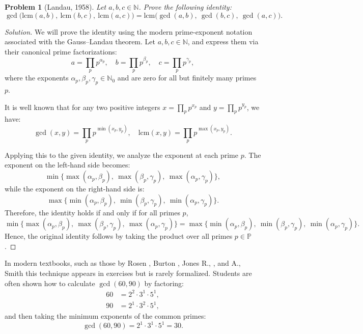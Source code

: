 \documentclass[11pt]{article}
\theoremstyle{plain}
\newtheorem*{problem}{Problem}
\begin{document}
\begin{problem}[Landau, 1958]
Let \( a, b, c \in \mathbb{N} \). Prove the following identity:
\[
\gcd\big(\mathrm{lcm}(a,b),\ \mathrm{lcm}(b,c),\ \mathrm{lcm}(a,c)\big) = 
\mathrm{lcm}\big(\gcd(a,b),\ \gcd(b,c),\ \gcd(a,c)\big).
\]
\end{problem}
\begin{proof}[Solution]
We will prove the identity using the modern prime-exponent notation associated with the Gauss–Landau theorem. Let \( a, b, c \in \mathbb{N} \), and express them via their canonical prime factorizations:
\[
a = \prod_p p^{\alpha_p}, \quad b = \prod_p p^{\beta_p}, \quad c = \prod_p p^{\gamma_p},
\]
where the exponents \( \alpha_p, \beta_p, \gamma_p \in \mathbb{N}_0 \) and are zero for all but finitely many primes \( p \).
\medskip

\noindent
It is well known that for any two positive integers \( x = \prod_p p^{x_p} \) and \( y = \prod_p p^{y_p} \), we have:
\[
\gcd(x, y) = \prod_p p^{\min(x_p, y_p)}, \quad 
\mathrm{lcm}(x, y) = \prod_p p^{\max(x_p, y_p)}.
\]

\noindent
Applying this to the given identity, we analyze the exponent at each prime \( p \). The exponent on the left-hand side becomes:
\[
\min\Big\{ \max(\alpha_p, \beta_p),\ \max(\beta_p, \gamma_p),\ \max(\alpha_p, \gamma_p) \Big\},
\]
while the exponent on the right-hand side is:
\[
\max\Big\{ \min(\alpha_p, \beta_p),\ \min(\beta_p, \gamma_p),\ \min(\alpha_p, \gamma_p) \Big\}.
\]
\noindent
Therefore, the identity holds if and only if for all primes \( p \),
\[
\min\big\{ \max(\alpha_p, \beta_p),\ \max(\beta_p, \gamma_p),\ \max(\alpha_p, \gamma_p) \big\}
=
\max\big\{ \min(\alpha_p, \beta_p),\ \min(\beta_p, \gamma_p),\ \min(\alpha_p, \gamma_p) \big\}.
\]
Hence, the original identity follows by taking the product over all primes \( p \in \mathbb{P} \).
\end{proof}


In modern textbooks, such as those by Rosen \cite{Rosen}, Burton \cite{Burton}, Jones R., \cite{Jones2010}, and A., Smith \cite{Smith2015}
this technique appears in exercises but is rarely formalized. Students are often shown how to calculate $\gcd(60, 90)$ by factoring:
\begin{align*}
60 &= 2^2 \cdot 3^1 \cdot 5^1, \\
90 &= 2^1 \cdot 3^2 \cdot 5^1,
\end{align*}
and then taking the minimum exponents of the common primes:
\[
\gcd(60,90) = 2^1 \cdot 3^1 \cdot 5^1 = 30.
\]
\end{document}
